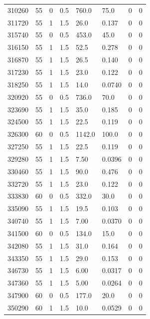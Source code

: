 \documentclass[preview]{standalone}
\begin{document}
{{{{{{{\begin{tabular}{L{1.2cm}C{1.2cm} C{0.3cm}C{0.5cm} C{1.4cm}C{1.4cm} C{1.4cm}C{1.4cm}}
  310260  &    55  & 0     & 0.5 &  760.0  & 75.0  & 0 &  0   \\ 
  311720  &    55  & 1     & 1.5 &  26.0  & 0.137  & 0 &  0   \\ 
  315740  &    55  & 0     & 0.5 &  453.0  & 45.0  & 0 &  0   \\ 
  316150  &    55  & 1     & 1.5 &  52.5  & 0.278  & 0 &  0   \\ 
  316870  &    55  & 1     & 1.5 &  26.5  & 0.140  & 0 &  0   \\ 
  317230  &    55  & 1     & 1.5 &  23.0  & 0.122  & 0 &  0   \\ 
  318250  &    55  & 1     & 1.5 &  14.0  & 0.0740  & 0 &  0   \\ 
  320920  &    55  & 0     & 0.5 &  736.0  & 70.0  & 0 &  0   \\ 
  323690  &    55  & 1     & 1.5 &  35.0  & 0.185  & 0 &  0   \\ 
  324500  &    55  & 1     & 1.5 &  22.5  & 0.119  & 0 &  0   \\ 
  326300  &    60  & 0     & 0.5 &  1142.0  & 100.0  & 0 &  0   \\ 
  327250  &    55  & 1     & 1.5 &  22.5  & 0.119  & 0 &  0   \\ 
  329280  &    55  & 1     & 1.5 &  7.50  & 0.0396  & 0 &  0   \\ 
  330460  &    55  & 1     & 1.5 &  90.0  & 0.476  & 0 &  0   \\ 
  332720  &    55  & 1     & 1.5 &  23.0  & 0.122  & 0 &  0   \\ 
  333830  &    60  & 0     & 0.5 &  332.0  & 30.0  & 0 &  0   \\ 
  335090  &    55  & 1     & 1.5 &  19.5  & 0.103  & 0 &  0   \\ 
  340740  &    55  & 1     & 1.5 &  7.00  & 0.0370  & 0 &  0   \\ 
  341500  &    60  & 0     & 0.5 &  134.0  & 15.0  & 0 &  0   \\ 
  342080  &    55  & 1     & 1.5 &  31.0  & 0.164  & 0 &  0   \\ 
  343350  &    55  & 1     & 1.5 &  29.0  & 0.153  & 0 &  0   \\ 
  346730  &    55  & 1     & 1.5 &  6.00  & 0.0317  & 0 &  0   \\ 
  347360  &    55  & 1     & 1.5 &  5.00  & 0.0264  & 0 &  0   \\ 
  347900  &    60  & 0     & 0.5 &  177.0  & 20.0  & 0 &  0   \\ 
  350290  &    60  & 1     & 1.5 &  10.0  & 0.0529  & 0 &  0   \\ 
\hline 
\end{tabular} 

}}}}}}}
\end{document}
